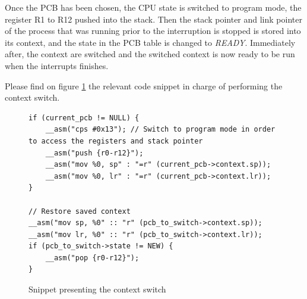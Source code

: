 Once the PCB has been chosen, the CPU state is switched to program mode, the register R1 to R12 pushed into the stack. Then the stack pointer and link pointer of the process that was running prior to the interruption is stopped is stored into its context, and the state in the PCB table is changed to \textit{READY}. Immediately after, the context are switched and the switched context is now ready to be run when the interrupts finishes.

Please find on figure \ref{fig:chapter5_snippet_context_switch} the relevant code snippet in charge of performing the context switch.

\begin{figure}[H]
\begin{minipage}{\linewidth}
\begin{lstlisting}[frame=single]
if (current_pcb != NULL) {
    __asm("cps #0x13"); // Switch to program mode in order to access the registers and stack pointer
    __asm("push {r0-r12}");
    __asm("mov %0, sp" : "=r" (current_pcb->context.sp));
    __asm("mov %0, lr" : "=r" (current_pcb->context.lr));
}

// Restore saved context
__asm("mov sp, %0" :: "r" (pcb_to_switch->context.sp));
__asm("mov lr, %0" :: "r" (pcb_to_switch->context.lr));
if (pcb_to_switch->state != NEW) {
    __asm("pop {r0-r12}");
}
\end{lstlisting}
\end{minipage}
\caption{Snippet presenting the context switch}
\label{fig:chapter5_snippet_context_switch}
\end{figure}

